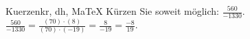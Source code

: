 \begin{MAufgabe}{Kuerzen}{kr, dh, MaTeX}
K\"urzen Sie soweit m\"oglich: $\frac{560}{-1330}$.\\ 
\ifLsg\MLoesung
\quad $\frac{560}{-1330}=\frac{(70)\cdot(8)}{(70)\cdot(-19)}=\frac{8}{-19}=\frac{-8}{19}$.\else\relax\fi
 \end{MAufgabe}